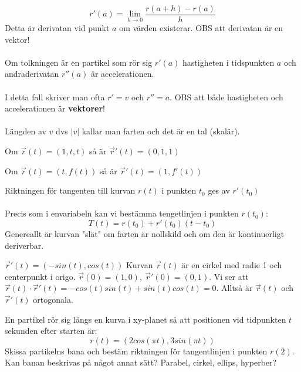 \documentclass{report}
\begin{document}
\dfn{Derivata av en funktioner fr[n $ \mathbb{R} $ till $ \mathbb{R}^n$}
{
\begin{equation*}
r'(a) = \lim_{h \to 0} \frac{r(a+h)-r(a)}{h}  
\end{equation*}
Detta är derivatan vid punkt $ a $ om värden existerar. OBS att derivatan är en vektor!\\\\

Om tolkningen är en partikel som rör sig $ r'(a) $ hastigheten i tidspunkten $ a $ och andraderivatan $ r''(a) $ är accelerationen.\\\\

I detta fall skriver man ofta $ r' = v $ och $ r'' = a $. OBS att både hastigheten och accelerationen är \textbf{vektorer}!\\\\

Längden av $ v $ dvs $ |v| $ kallar man farten och det är en tal (skalär).
}

\ex{}
{
Om $ \vec{r} (t) = (1,t,t) $ så är $ \vec{r}' (t) = (0,1,1) $ 
}

\ex{}
{
Om $ \vec{r} (t) = (t, f(t)) $ så är $ \vec{r}'(t) = (1, f'(t)) $ 
}

{
Riktningen för tangenten till kurvan $ r(t) $ i punkten $ t_0 $ ges av $ r'(t_0) $\\\\

Precis som i envariabeln kan vi bestämma tengetlinjen i punkten $ r(t_0) $:
\begin{equation*}
T(t) = r(t_0) + r'(t_0)(t-t_0)
\end{equation*}
Genereallt är kurvan "slät" om farten är nollskild och om den är kontinuerligt deriverbar. 
}

{
$ \vec{r}'(t) = (-sin(t), cos(t)) $ 
	Kurvan $ \vec{r} (t) $ är en cirkel med radie 1 och centerpunkt i origo. $ \vec{r}(0) = (1,0),\: \vec{r}'(0) = (0,1) $. Vi ser att $ \vec{r}(t) \cdot \vec{r}'(t) = -cos(t)sin(t) + sin(t)cos(t) = 0 $. Alltså är $ \vec{r} (t) $ och $ \vec{r}' (t)  $ ortogonala.   
}

\qs{}
{
En partikel rör sig längs en kurva i xy-planet så att positionen vid tidpunkten $ t $ sekunden efter starten är:
\begin{equation*}
r(t) = (2cos(\pi t), 3sin(\pi t))
\end{equation*}
Skissa partikelns bana och bestäm riktningen för tangentlinjen i punkten $ r(2) $. Kan banan beskrivas på något annat sätt? Parabel, cirkel, ellips, hyperber?
}
\end{document}
